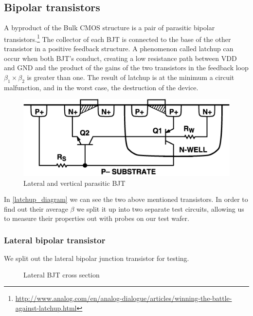 \subsection{Bipolar transistors}
A byproduct of the Bulk CMOS structure is a pair of parasitic bipolar transistors.\footnote{\url{http://www.analog.com/en/analog-dialogue/articles/winning-the-battle-against-latchup.html}}
The collector of each BJT is connected to the base of the other transistor in a positive feedback structure.
A phenomenon called latchup can occur when both BJT's conduct, creating a low resistance path between VDD and GND and the product of the gains of the two transistors in the feedback loop $\beta_1 \times \beta_2$ is greater than one.
The result of latchup is at the minimum a circuit malfunction, and in the worst case, the destruction of the device.

\begin{figure}[H]
	\centering
	\includegraphics[scale=0.5]{latchup_cross.png}
	\caption{Lateral and vertical parasitic BJT}
	\label{latchup_diagram}
\end{figure}

In \autoref{latchup_diagram} we can see the two above mentioned transistors. In order to find out their average $\beta$ we split it up into two separate test circuits, allowing us to measure their properties out with probes on our test wafer.

\subsubsection{Lateral bipolar transistor}

We split out the lateral bipolar junction transistor for testing.

\begin{figure}[H]
	\centering
	\begin{tikzpicture}[node distance = 3cm, auto, thick,scale=0.5, every node/.style={transform shape}]
		
	\end{tikzpicture}
	\caption{Lateral BJT cross section}
	\label{lateral_bjt_cross_section}
\end{figure}

